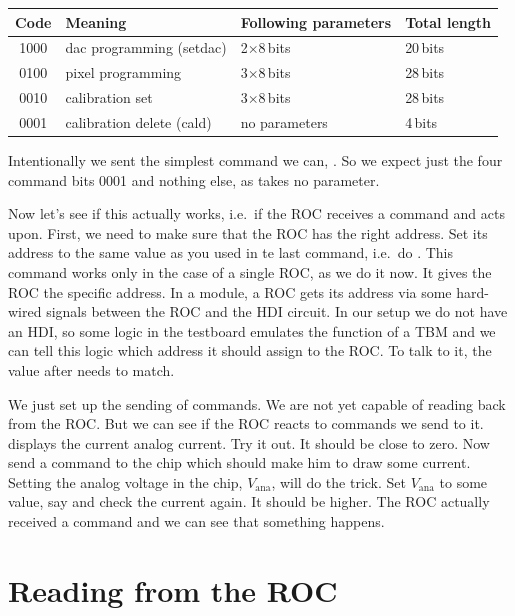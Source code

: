 \bigskip

\begin{tabular}{clll}
    \toprule
    Code & Meaning & Following parameters & Total length \\
    \midrule
    1000 & dac programming (setdac)    & 2$\times$8\,bits & 20\,bits \\
    0100 & pixel programming           & 3$\times$8\,bits & 28\,bits \\
    0010 & calibration set             & 3$\times$8\,bits & 28\,bits \\
    0001 & calibration delete (cald) & no parameters & 4\,bits \\
    \bottomrule
\end{tabular}

\bigskip

Intentionally we sent the simplest command we can, . So we expect just the four command bits 0001 and nothing else, as  takes no parameter.

Now let's see if this actually works, i.e.~if the \gls{ROC} receives a command and acts upon. First, we need to make sure that the \gls{ROC} has the right address. Set its address to the same value as you used in te last  command, i.e.~do . This command works only in the case of a single \gls{ROC}, as we do it now. It gives the \gls{ROC} the specific address. In a module, a \gls{ROC} gets its address via some hard-wired signals between the \gls{ROC} and the \gls{HDI} circuit. In our setup we do not have an \gls{HDI}, so some logic in the testboard emulates the function of a \gls{TBM} and we can tell this logic which address it should assign to the \gls{ROC}. To talk to it, the value after  needs to match.

We just set up the sending of commands. We are not yet capable of reading back from the \gls{ROC}. But we can see if the \gls{ROC} reacts to commands we send to it.  displays the current analog current. Try it out. It should be close to zero. Now send a command to the chip which should make him to draw some current. Setting the analog voltage in the chip, $V_\text{ana}$, will do the trick. Set $V_\text{ana}$ to some value, say  and check the current again. It should be higher. The \gls{ROC} actually received a command and we can see that something happens.

\section{Reading from the ROC}

